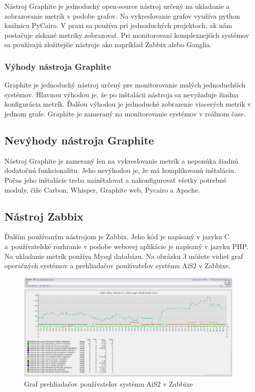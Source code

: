 \documentclass[a4paper, usesections, upjsfrontpage, thesismargins, thesislinespacing, twoside]{rnthesissvk}
\begin{document}
Nástroj Graphite je jednoduchý open-source nástroj určený na ukladanie a zobrazovanie metrík v podobe grafov.
Na vykresľovanie grafov využíva python knižnicu PyCairo.
V praxi sa používa pri jednoduchých projektoch, ak nám postačuje získané metriky zobrazovať.
Pri monitorovaní komplexnejších systémov sa používajú zložitejšie nástroje ako napríklad Zabbix alebo Ganglia.

\subsubsection{Výhody nástroja Graphite}

Graphite je jednoduchý nástroj určený pre monitorovanie malých jednoduchších systémov.
Hlavnou výhodou je, že po inštalácii nástroja sa nevyžaduje žiadna konfigurácia metrík.
Ďalšou výhodou je jednoduché zobrazenie viacerých metrík v jednom grafe.
Graphite je zameraný na monitorovanie systémov v reálnom čase.

\subsection{Nevýhody nástroja Graphite}

Nástroj Graphite je zameraný len na vykresľovanie metrík a neponúka žiadnú dodatočnú funkcionalitu.
Jeho nevýhodou je, že má komplikovanú inštaláciu.
Počas jeho inštalácie treba nainštalovať a nakonfigurovať všetky potrebné moduly, čiže Carbon, Whisper, Graphite web, Pycairo a Apache.

\subsection{Nástroj Zabbix}

Ďalším používaným nástrojom je Zabbix.
Jeho kód je napísaný v jazyku C a~používateľské rozhranie v podobe webovej aplikácie je napísaný v jazyku PHP.
Na ukladanie metrík používa Mysql databázu.
Na obrázku 3 môžete vidieť graf operačných systémov a prehliadačov používateľov systému AiS2 v Zabbixe.

\begin{figure}
	\begin{center}
		\includegraphics[scale=0.41]{zabbix1.png}
	\end{center}
	\caption{Graf prehliadačov používateľov systému AiS2 v Zabbixe}
\end{figure}
\end{document}
